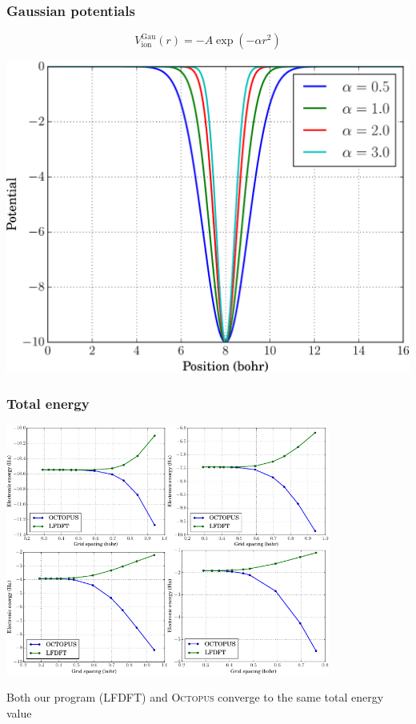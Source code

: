 \documentclass[10pt,t]{beamer}
\begin{document}
\begin{frame}
\frametitle{Gaussian potentials}

\begin{equation*}
V^{\mathrm{Gau}}_{\mathrm{ion}}(r) = -A\exp(-\alpha r^2)
\end{equation*}

{
\centering
\includegraphics[scale=0.5]{images/V_gauss.pdf}
\par
}

\end{frame}


\begin{frame}
\frametitle{Total energy}  

{\centering
\includegraphics[width=0.8\textwidth]{images/COMBINE_v2.pdf}
\par
Both our program (LFDFT) and \textsc{Octopus} converge to the same total energy value
\par}

\end{frame}
\end{document}
